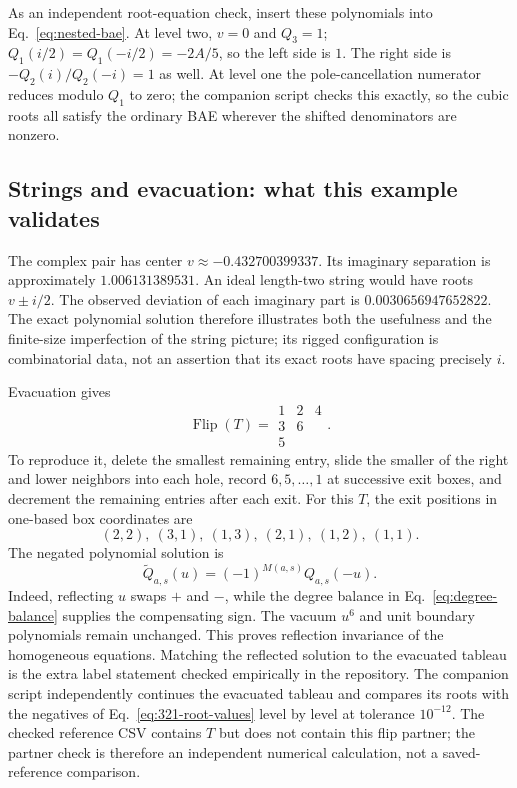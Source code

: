\documentclass[11pt]{article}
\begin{document}
As an independent root-equation check, insert these polynomials into
Eq.~\eqref{eq:nested-bae}. At level two, $v=0$ and $Q_3=1$;
$Q_1(i/2)=Q_1(-i/2)=-2A/5$, so the left side is $1$.
The right side is $-Q_2(i)/Q_2(-i)=1$ as well. At level one the
pole-cancellation numerator reduces modulo $Q_1$ to zero; the companion
script checks this exactly, so the cubic roots all satisfy the ordinary
BAE wherever the shifted denominators are nonzero.

\subsection{Strings and evacuation: what this example validates}

The complex pair has center $v\approx-0.432700399337$. Its imaginary
separation is approximately $1.006131389531$. An ideal length-two string would have
roots $v\pm i/2$. The observed deviation of each imaginary part is
$0.0030656947652822$. The exact polynomial solution therefore illustrates
both the usefulness and the finite-size imperfection of the string
picture; its rigged configuration is combinatorial data, not an assertion
that its exact roots have spacing precisely $i$.

Evacuation gives
\[
 \operatorname{Flip}(T)=\begin{array}{ccc}1&2&4\\3&6&\\5&&\end{array}.
\]
To reproduce it, delete the smallest remaining entry, slide the smaller
of the right and lower neighbors into each hole, record $6,5,\ldots,1$
at successive exit boxes, and decrement the remaining entries after each
exit. For this $T$, the exit positions in one-based box coordinates are
\[
 (2,2),\ (3,1),\ (1,3),\ (2,1),\ (1,2),\ (1,1).
\]
The negated polynomial solution is
\[
 \widetilde Q_{a,s}(u)=(-1)^{M(a,s)}Q_{a,s}(-u).
\]
Indeed, reflecting $u$ swaps $+$ and $-$, while the degree balance in
Eq.~\eqref{eq:degree-balance} supplies the compensating sign. The vacuum
$u^6$ and unit boundary polynomials remain unchanged. This proves
reflection invariance of the homogeneous equations. Matching the
reflected solution to the evacuated tableau is the extra label statement
checked empirically in the repository. The companion script independently continues the evacuated tableau
and compares its roots with the negatives of Eq.~\eqref{eq:321-root-values}
level by level at tolerance $10^{-12}$. The checked reference CSV contains
$T$ but does not contain this flip partner; the partner check is therefore
an independent numerical calculation, not a saved-reference comparison.
\end{document}
